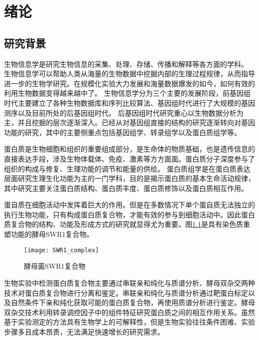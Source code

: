 \chapter{绪论}
\label{chapter:intro}


\section{研究背景}
\label{section:intro:background}

生物信息学是研究生物信息的采集、处理、存储、传播和解释等各方面的学科。
生物信息学可以帮助人类从海量的生物数据中挖掘内部的生理过程规律，从而指导进一步的生物学研究。在规模化实验大力发展和海量数据爆发的如今，如何有效的利用生物数据变得越来越中了。
生物信息学分为三个主要的发展阶段，前基因组时代主要建立了各种生物数据库和序列比较算法、基因组时代进行了大规模的基因测序以及目前所处的后基因组时代。
后基因组时代研究重心以生物数据分析为主，并且挖掘的层次逐渐深入。已经从对基因组直接的结构的研究逐渐转向对基因功能的研究，其中的主要侧重点包括基因组学、转录组学以及蛋白质组学等\cite{helms_principles_2019}。

蛋白质是生物细胞和组织的重要组成部分，是生命体的物质基础，也是遗传信息的直接表达手段，涉及生物体载体、免疫、激素等方方面面。蛋白质分子深度参与了组织的构成与修复、生理功能的调节和能量的供给。
蛋白质组学\cite{schubert_quantitative_2017}是在蛋白质表达层面研究生理生化功能为主的一门学科，目的是揭示蛋白质的基本生命活动规律，其中研究主要关注蛋白质结构、蛋白质丰度、蛋白质修饰以及蛋白质相互作用。

蛋自质在细胞活动中发挥着巨大的作用。但是在多数情况下单个蛋自质无法独立的执行生物功能，只有构成蛋白质复合物，才能有效的参与到细胞活动中\cite{gavin_functional_2002}。因此蛋白质复合物的结构、功能及形成方式的研究就显得尤为重要。图\ref{fig:swr1_complex}是具有染色质重塑功能的酵母SWR1复合物。
\begin{figure}[htbp]
  \centering
  \texttt{[image: SWR1\_complex]}
  \caption{酵母菌SWR1复合物}
  \label{fig:swr1_complex}
\end{figure}
生物实验中检测蛋白质复合物主要通过串联亲和纯化与质谱分析\cite{g_generic_1999}、酵母双杂交\cite{li_identification_1993}两种技术对蛋白质复合物进行分离和鉴定。串联亲和纯化与质谱分析通过靶蛋白标定以及自然条件下亲和纯化获取可能的蛋白质复合物，再使用质谱分析进行鉴定。酵母双杂交技术利用转录调控因子中的组件特征研究蛋白质之间的相互作用关系。虽然基于实验测定的方法具有生物学上的可解释性，但是生物实验往往条件困难、实验步骤多且成本昂贵，无法满足快速增长的研究需求。

